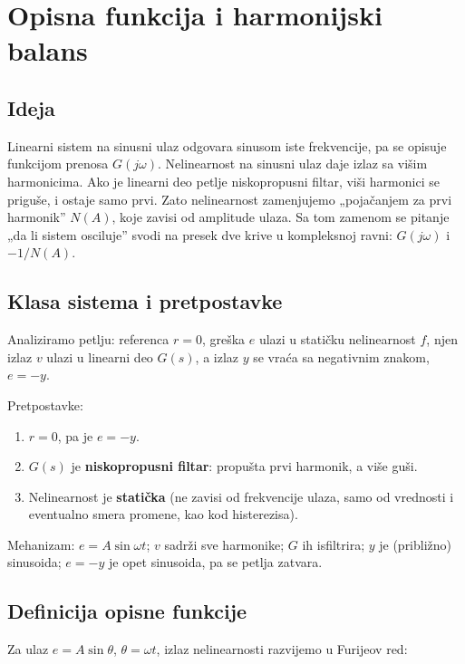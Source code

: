 \documentclass[11pt,a4paper,parskip=half,headsepline,numbers=noenddot]{scrartcl}
\begin{document}
\section{Opisna funkcija i harmonijski balans}

\subsection{Ideja}

Linearni sistem na sinusni ulaz odgovara sinusom iste frekvencije, pa se opisuje funkcijom prenosa \(G(j\omega)\). Nelinearnost na sinusni ulaz daje izlaz sa višim harmonicima. Ako je linearni deo petlje niskopropusni filtar, viši harmonici se priguše, i ostaje samo prvi. Zato nelinearnost zamenjujemo „pojačanjem za prvi harmonik'' \(N(A)\), koje zavisi od amplitude ulaza. Sa tom zamenom se pitanje „da li sistem osciluje'' svodi na presek dve krive u kompleksnoj ravni: \(G(j\omega)\) i \(-1/N(A)\).

\subsection{Klasa sistema i pretpostavke}

Analiziramo petlju: referenca \(r = 0\), greška \(e\) ulazi u statičku nelinearnost \(f\), njen izlaz \(v\) ulazi u linearni deo \(G(s)\), a izlaz \(y\) se vraća sa negativnim znakom, \(e = -y\).

Pretpostavke:

\begin{enumerate}
\def\labelenumi{\arabic{enumi}.}
\item \(r = 0\), pa je \(e = -y\).
\item \(G(s)\) je \textbf{niskopropusni filtar}: propušta prvi harmonik, a više guši.
\item Nelinearnost je \textbf{statička} (ne zavisi od frekvencije ulaza, samo od vrednosti i eventualno smera promene, kao kod histerezisa).
\end{enumerate}

Mehanizam: \(e = A\sin\omega t\); \(v\) sadrži sve harmonike; \(G\) ih isfiltrira; \(y\) je (približno) sinusoida; \(e = -y\) je opet sinusoida, pa se petlja zatvara.

\subsection{Definicija opisne funkcije}

Za ulaz \(e = A\sin\theta\), \(\theta = \omega t\), izlaz nelinearnosti razvijemo u Furijeov red:
\end{document}
